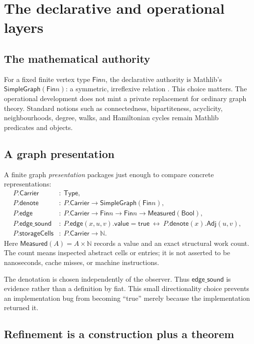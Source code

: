 \documentclass[11pt]{article}
\theoremstyle{remark}
\newcommand{\SG}{\mathsf{SimpleGraph}}
\newcommand{\Fin}{\mathsf{Fin}}
\begin{document}
\section{The declarative and operational layers}
\label{sec:layers}

\subsection{The mathematical authority}

For a fixed finite vertex type \(\Fin n\), the declarative authority is
Mathlib's \(\SG(\Fin n)\): a symmetric, irreflexive relation
\cite{mathlib,diestel}.  This choice matters.  The operational development
does not mint a private replacement for ordinary graph theory.  Standard
notions such as connectedness, bipartiteness, acyclicity, neighbourhoods,
degree, walks, and Hamiltonian cycles remain Mathlib predicates and objects.

\subsection{A graph presentation}

A finite graph \emph{presentation} packages just enough to compare concrete
representations:
\[
\begin{aligned}
  P.\mathsf{Carrier} &:\ \mathsf{Type},\\
  P.\mathsf{denote} &:\ P.\mathsf{Carrier}\to\SG(\Fin n),\\
  P.\mathsf{edge} &:\ P.\mathsf{Carrier}\to\Fin n\to\Fin n
      \to \mathsf{Measured}(\mathsf{Bool}),\\
  P.\mathsf{edge\_sound} &:\
      P.\mathsf{edge}(x,u,v).\mathsf{value}=\mathsf{true}
      \ \longleftrightarrow\ P.\mathsf{denote}(x).\mathsf{Adj}(u,v),\\
  P.\mathsf{storageCells} &:\ P.\mathsf{Carrier}\to\mathbb{N}.
\end{aligned}
\]
Here \(\mathsf{Measured}(A)=A\times\mathbb{N}\) records a value and an exact
structural work count.  The count means inspected abstract cells or entries;
it is not asserted to be nanoseconds, cache misses, or machine instructions.

The denotation is chosen independently of the observer.  Thus
\(\mathsf{edge\_sound}\) is evidence rather than a definition by fiat.  This
small directionality choice prevents an implementation bug from becoming
``true'' merely because the implementation returned it.

\subsection{Refinement is a construction plus a theorem}
\end{document}
